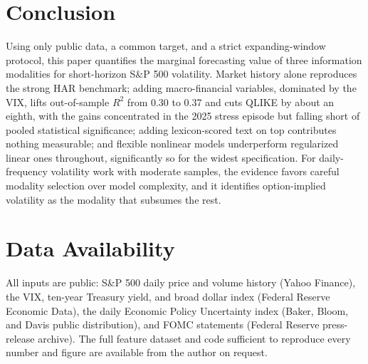 \documentclass[10pt,twocolumn]{article}
\begin{document}
\section{Conclusion}
Using only public data, a common target, and a strict expanding-window protocol, this paper quantifies the marginal forecasting value of three information modalities for short-horizon S\&P 500 volatility. Market history alone reproduces the strong HAR benchmark; adding macro-financial variables, dominated by the VIX, lifts out-of-sample $R^2$ from 0.30 to 0.37 and cuts QLIKE by about an eighth, with the gains concentrated in the 2025 stress episode but falling short of pooled statistical significance; adding lexicon-scored text on top contributes nothing measurable; and flexible nonlinear models underperform regularized linear ones throughout, significantly so for the widest specification. For daily-frequency volatility work with moderate samples, the evidence favors careful modality selection over model complexity, and it identifies option-implied volatility as the modality that subsumes the rest.

\section*{Data Availability}
All inputs are public: S\&P 500 daily price and volume history (Yahoo Finance), the VIX, ten-year Treasury yield, and broad dollar index (Federal Reserve Economic Data), the daily Economic Policy Uncertainty index (Baker, Bloom, and Davis public distribution), and FOMC statements (Federal Reserve press-release archive). The full feature dataset and code sufficient to reproduce every number and figure are available from the author on request.
\end{document}
